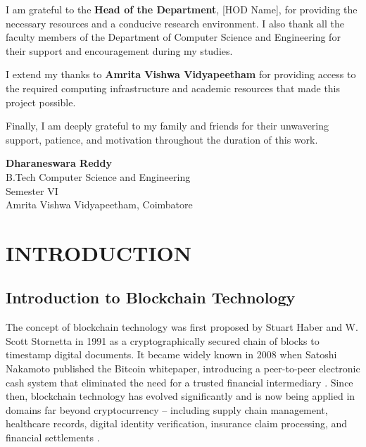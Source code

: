 \documentclass[12pt,a4paper]{report}
\begin{document}
I am grateful to the \textbf{Head of the Department}, [HOD Name], for providing the
necessary resources and a conducive research environment. I also thank all the faculty
members of the Department of Computer Science and Engineering for their support and
encouragement during my studies.

I extend my thanks to \textbf{Amrita Vishwa Vidyapeetham} for providing access to the
required computing infrastructure and academic resources that made this project possible.

Finally, I am deeply grateful to my family and friends for their unwavering support,
patience, and motivation throughout the duration of this work.

\vspace{1.5cm}
\begin{flushright}
  \textbf{Dharaneswara Reddy}\\
  B.Tech Computer Science and Engineering\\
  Semester VI\\
  Amrita Vishwa Vidyapeetham, Coimbatore
\end{flushright}

\newpage

\tableofcontents
\newpage

\listoffigures
\newpage

\listoftables
\newpage

\chapter{INTRODUCTION}

\section{Introduction to Blockchain Technology}

The concept of blockchain technology was first proposed by Stuart Haber and W. Scott
Stornetta in 1991 as a cryptographically secured chain of blocks to timestamp digital
documents. It became widely known in 2008 when Satoshi Nakamoto published the Bitcoin
whitepaper, introducing a peer-to-peer electronic cash system that eliminated the need
for a trusted financial intermediary \cite{nakamoto2008}. Since then, blockchain
technology has evolved significantly and is now being applied in domains far beyond
cryptocurrency -- including supply chain management, healthcare records, digital identity
verification, insurance claim processing, and financial settlements \cite{zheng2017}.
\end{document}

